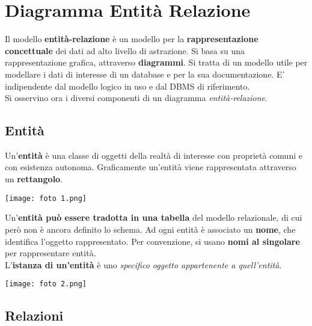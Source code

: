 \documentclass{article}
\begin{document}
\pagestyle{empty}

\section*{Diagramma Entità Relazione} 
\large

Il modello \textbf{entità-relazione} è un modello per la \textbf{rappresentazione concettuale} dei dati ad alto livello di astrazione. Si basa su una rappresentazione grafica, attraverso \textbf{diagrammi}. Si tratta di un modello utile per modellare i dati di interesse di un database e per la sua documentazione. E' indipendente dal modello logico in uso e dal DBMS di riferimento.\\
Si osservino ora i diversi componenti di un diagramma \textit{entità-relazione}.

\subsection*{Entità}
\large

Un'\textbf{entità} è una classe di oggetti della realtà di interesse con proprietà comuni e con esistenza autonoma. Graficamente un'entità viene rappresentata attraverso un \textbf{rettangolo}.
\begin{center}
    \texttt{[image: foto 1.png]}
\end{center}
Un'\textbf{entità può essere tradotta in una tabella} del modello relazionale, di cui però non è ancora definito lo schema. Ad ogni entità è associato un \textbf{nome}, che identifica l'oggetto rappresentato. Per convenzione, si usano \textbf{nomi al singolare} per rappresentare entità.\\
L'\textbf{istanza di un'entità} è uno \textit{specifico oggetto appartenente a quell'entità}.
\begin{center}
    \texttt{[image: foto 2.png]}
\end{center}

\subsection*{Relazioni}
\large
\end{document}
